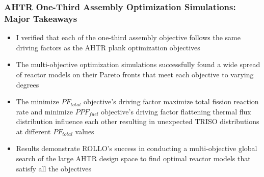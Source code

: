 \begin{frame}
    \frametitle{AHTR One-Third Assembly Optimization Simulations: Major Takeaways}
    \begin{itemize}
        \item I verified that each of the one-third assembly objective follows 
        the same driving factors as the AHTR plank optimization objectives
        \item The multi-objective optimization simulations successfully found a 
        wide spread of reactor models on their Pareto fronts that meet each 
        objective to varying degrees
        \item The minimize $PF_{total}$ objective's driving factor maximize 
        total fission reaction rate and minimize $PPF_{fuel}$ objective's driving 
        factor flattening thermal flux distribution influence each other resulting 
        in unexpected TRISO distributions at different $PF_{total}$ values 
        \item  Results demonstrate ROLLO's success in conducting a multi-objective 
        global search of the large AHTR design space to find optimal reactor models 
        that satisfy all the objectives
    \end{itemize}
\end{frame}